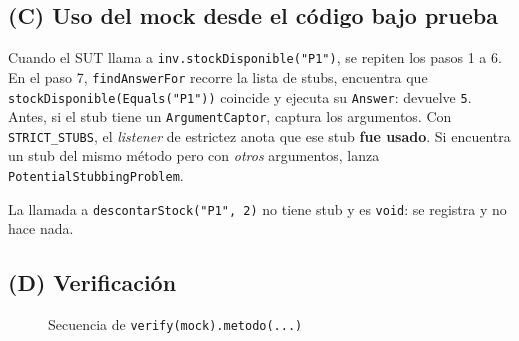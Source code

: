 \documentclass[11pt,a4paper,oneside]{report}
\newcommand{\code}[1]{\texttt{#1}}
\begin{document}
\subsection{(C) Uso del mock desde el código bajo prueba}
Cuando el SUT llama a \code{inv.stockDisponible("P1")}, se repiten los pasos 1 a 6. En el paso 7, \code{findAnswerFor} recorre la lista de stubs, encuentra que \code{stockDisponible(Equals("P1"))} coincide y ejecuta su \code{Answer}: devuelve \code{5}. Antes, si el stub tiene un \code{ArgumentCaptor}, captura los argumentos. Con \code{STRICT\_STUBS}, el \emph{listener} de estrictez anota que ese stub \textbf{fue usado}. Si encuentra un stub del mismo método pero con \emph{otros} argumentos, lanza \code{PotentialStubbingProblem}.

La llamada a \code{descontarStock("P1", 2)} no tiene stub y es \code{void}: se registra y no hace nada.

\subsection{(D) Verificación}
\begin{figure}[H]
\centering
{}
\caption{Secuencia de \code{verify(mock).metodo(...)}}
\end{figure}
\end{document}
